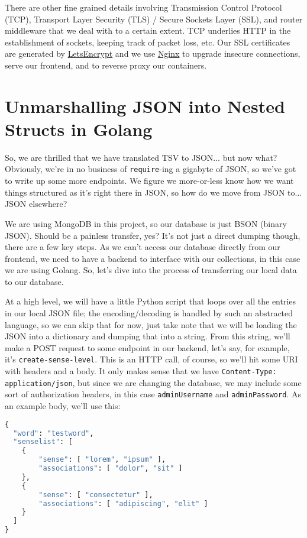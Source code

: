 \documentclass[11pt, twoside, reqno]{book}
\begin{document}
There are other fine grained details involving Transmission Control Protocol (TCP), Transport Layer Security (TLS) / Secure Sockets Layer (SSL), and router middleware that we deal with to a certain extent. TCP underlies HTTP in the establishment of sockets, keeping track of packet loss, etc. Our SSL certificates are generated by \href{https://letsencrypt.org/}{LetsEncrypt} and we use \href{https://www.nginx.com}{Nginx} to upgrade insecure connections, serve our frontend, and to reverse proxy our containers.


\section{Unmarshalling JSON into Nested Structs in Golang}

So, we are thrilled that we have translated TSV to JSON... but now what? Obviously, we're in no business of \texttt{require}-ing a gigabyte of JSON, so we've got to write up some more endpoints. We figure we more-or-less know how we want things structured as it's right there in JSON, so how do we move from JSON to... \textit{}JSON elsewhere\textit{}?

We are using MongoDB in this project, so our database is just BSON (binary JSON). Should be a painless transfer, yes? It's not just a direct dumping though, there are a few key steps. As we can't access our database directly from our frontend, we need to have a backend to interface with our collections, in this case we are using Golang. So, let's dive into the process of transferring our local data to our database.

At a high level, we will have a little Python script that loops over all the entries in our local JSON file; the encoding/decoding is handled by such an abstracted language, so we can skip that for now, just take note that we will be loading the JSON into a dictionary and dumping that into a string. From this string, we'll make a POST request to some endpoint in our backend, let's say, for example, it's  \texttt{create-sense-level}. This is an HTTP call, of course, so we'll hit some URI with headers and a body. It only makes sense that we have \texttt{Content-Type: application/json}, but since we are changing the database, we may include some sort of authorization headers, in this case \texttt{adminUsername} and \texttt{adminPassword}. As an example body, we'll use this:
\begin{lstlisting}[language=Python]
{
  "word": "testword",
  "senselist": [
  	{
  		"sense": [ "lorem", "ipsum" ],
  		"associations": [ "dolor", "sit" ]
  	},
  	{
  		"sense": [ "consectetur" ],
  		"associations": [ "adipiscing", "elit" ]
  	}
  ]
}
\end{lstlisting}
\end{document}

